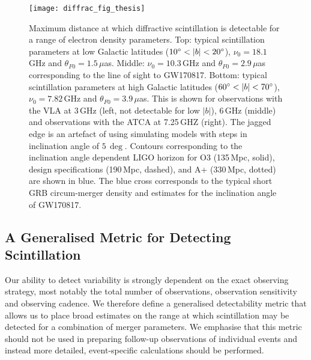 \begin{figure*}
\centering
\texttt{[image: diffrac\_fig\_thesis]}
\caption[Detectability of diffractive scintillation with current radio facilities]{\footnotesize Maximum distance at which diffractive scintillation is detectable for a range of electron density parameters. Top: typical scintillation parameters at low Galactic latitudes ($10\arcdeg<|b|<20\arcdeg$), $\nu_0 = 18.1$\,GHz and $\theta_{F0} = 1.5\,\mu$as. Middle: $\nu_0 = 10.3$\,GHz and $\theta_{F0} = 2.9\,\mu$as corresponding to the line of sight to GW170817. Bottom: typical scintillation parameters at high Galactic latitudes ($60\arcdeg<|b|<70\arcdeg$), $\nu_0 = 7.82$\,GHz and $\theta_{F0} = 3.9\,\mu$as. This is shown for observations with the VLA at 3\,GHz (left, not detectable for low $|b|$), 6\,GHz (middle) and observations with the ATCA at 7.25\,GHZ (right). The jagged edge is an artefact of using simulating models with steps in inclination angle of $5\,\deg$. Contours corresponding to the inclination angle dependent LIGO horizon for O3 (135\,Mpc, solid), design specifications (190\,Mpc, dashed), and A+ (330\,Mpc, dotted) are shown in blue. The blue cross corresponds to the typical short GRB circum-merger density and estimates for the inclination angle of GW170817.}
\label{fig:diffscintillation_distance}
\end{figure*}
\vspace{-3pt}
\subsection{A Generalised Metric for Detecting Scintillation}
\vspace{-2pt}
Our ability to detect variability is strongly dependent on the exact observing strategy, most notably the total number of observations, observation sensitivity and observing cadence. We therefore define a generalised detectability metric that allows us to place broad estimates on the range at which scintillation may be detected for a combination of merger parameters. We emphasise that this metric should not be used in preparing follow-up observations of individual events and instead more detailed, event-specific calculations should be performed. 

